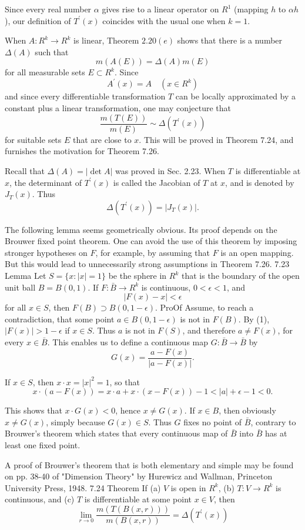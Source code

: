 Since every real number $\alpha$ gives rise to a linear operator on $R^1$ (mapping $h$ to $\alpha h$ ), our definition of $T^{\prime}(x)$ coincides with the usual one when $k=1$.

When $A: R^k \rightarrow R^k$ is linear, Theorem $2.20(e)$ shows that there is a number $\Delta(A)$ such that
$$
m(A(E))=\Delta(A) m(E)
$$
for all measurable sets $E \subset R^k$. Since
$$
A^{\prime}(x)=A \quad\left(x \in R^k\right)
$$
and since every differentiable transformation $T$ can be locally approximated by a constant plus a linear transformation, one may conjecture that
$$
\frac{m(T(E))}{m(E)} \sim \Delta\left(T^{\prime}(x)\right)
$$
for suitable sets $E$ that are close to $x$. This will be proved in Theorem 7.24, and furnishes the motivation for Theorem 7.26.

Recall that $\Delta(A)=|\operatorname{det} A|$ was proved in Sec. 2.23. When $T$ is differentiable at $x$, the determinant of $T^{\prime}(x)$ is called the Jacobian of $T$ at $x$, and is denoted by $J_T(x)$. Thus
$$
\Delta\left(T^{\prime}(x)\right)=\left|J_T(x)\right| .
$$

The following lemma seems geometrically obvious. Its proof depends on the Brouwer fixed point theorem. One can avoid the use of this theorem by imposing stronger hypotheses on $F$, for example, by assuming that $F$ is an open mapping. But this would lead to unnecessarily strong assumptions in Theorem 7.26.
7.23 Lemma Let $S=\{x:|x|=1\}$ be the sphere in $R^k$ that is the boundary of the open unit ball $B=B(0,1)$.
If $F: \bar{B} \rightarrow R^k$ is continuous, $0<\epsilon<1$, and
$$
|F(x)-x|<\epsilon
$$
for all $x \in S$, then $F(B) \supset B(0,1-\epsilon)$.
ProOf Assume, to reach a contradiction, that some point $a \in B(0,1-\epsilon)$ is not in $F(B)$. By (1), $|F(x)|>1-\epsilon$ if $x \in S$. Thus $a$ is not in $F(S)$, and therefore $a \neq F(x)$, for every $x \in \bar{B}$. This enables us to define a continuous map $G: \bar{B} \rightarrow \bar{B}$ by
$$
G(x)=\frac{a-F(x)}{|a-F(x)|} .
$$

If $x \in S$, then $x \cdot x=|x|^2=1$, so that
$$
x \cdot(a-F(x))=x \cdot a+x \cdot(x-F(x))-1<|a|+\epsilon-1<0 .
$$

This shows that $x \cdot G(x)<0$, hence $x \neq G(x)$.
If $x \in B$, then obviously $x \neq G(x)$, simply because $G(x) \in S$.
Thus $G$ fixes no point of $\bar{B}$, contrary to Brouwer's theorem which states that every continuous map of $\bar{B}$ into $\bar{B}$ has at least one fixed point. 

A proof of Brouwer's theorem that is both elementary and simple may be found on pp. 38-40 of "Dimension Theory" by Hurewicz and Wallman, Princeton University Press, 1948.
7.24 Theorem If
(a) $V$ is open in $R^k$,
(b) $T: V \rightarrow R^k$ is continuous, and
(c) $T$ is differentiable at some point $x \in V$, then
$$
\lim _{r \rightarrow 0} \frac{m(T(B(x, r)))}{m(B(x, r))}=\Delta\left(T^{\prime}(x)\right)
$$

